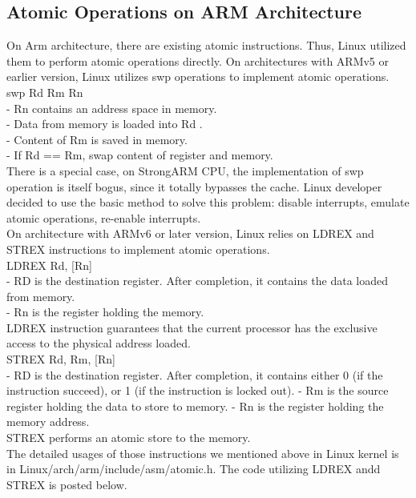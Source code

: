 \documentclass[10pt]{sigplanconf}
\begin{document}
\subsection{Atomic Operations on ARM Architecture}
On Arm architecture, there are existing atomic instructions. Thus, Linux utilized them to perform atomic operations directly. On architectures with ARMv5 or earlier version, Linux utilizes swp operations to implement atomic operations.\\
swp Rd Rm Rn\\
- Rn contains an address space in memory.\\
- Data from memory is loaded into Rd .\\
- Content of Rm is saved in memory.\\
- If Rd == Rm, swap content of register and memory.\\
There is a special case, on StrongARM CPU, the implementation of swp operation is itself bogus, since it totally bypasses the cache. Linux developer decided to use the basic method to solve this problem: disable interrupts, emulate atomic operations, re-enable interrupts.\\
On architecture with ARMv6 or later version, Linux relies on LDREX and STREX instructions to implement atomic operations.\\
LDREX Rd, [Rn]\\
- RD is the destination register. After completion, it contains the data loaded from memory.\\
- Rn is the register holding the memory.\\
LDREX instruction guarantees that the current processor has the exclusive access to the physical address loaded.\\
STREX Rd, Rm, [Rn]\\
- RD is the destination register. After completion, it contains either 0 (if the instruction succeed), or 1 (if the instruction is locked out).
- Rm is the source register holding the data to store to memory.
- Rn is the register holding the memory address.\\
STREX performs an atomic store to the memory.\\
The detailed usages of those instructions we mentioned above in Linux kernel is in Linux/arch/arm/include/asm/atomic.h. The code utilizing LDREX andd STREX is posted below.\\
\end{document}
